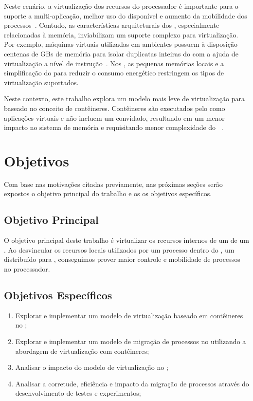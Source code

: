 Neste cenário, a virtualização dos recursos do processador é importante para o suporte a multi-aplicação, melhor uso do \hardware disponível e aumento da mobilidade dos processos~\cite{vanz2022virtualizaccao}. Contudo, as características arquiteturais dos \lws, especialmente relacionadas à memória, inviabilizam um suporte complexo para virtualização. Por exemplo, máquinas virtuais utilizadas em ambientes \cloud possuem à disposição centenas de GBs de memória para isolar duplicatas inteiras do \os com a ajuda de virtualização a nível de instrução~\cite{sharma2016containers}. Nos \lws, as pequenas memórias locais e a simplificação do \hardware para reduzir o consumo energético restringem os tipos de virtualização suportados.

Neste contexto, este trabalho explora um modelo mais leve de virtualização para \lws baseado no conceito de contêineres. Contêineres são executados pelo \os como aplicações virtuais e não incluem um \os convidado, resultando em um menor impacto no sistema de memória e requisitando menor complexidade do \hardware~\cite{thalheim2018cntr, sharma2016containers}.

\section{Objetivos}
\label{sec.goals}

Com base nas motivações citadas previamente, nas próximas seções serão expostos o objetivo principal do trabalho e os os objetivos específicos.

\subsection{Objetivo Principal}
\label{sec.goals.primary}

O objetivo principal deste trabalho é virtualizar os recursos internos de um \cluster de um \lw. Ao desvincular os recursos locais utilizados por um processo dentro do \nanvix, um \os distribuído para \lws, conseguimos prover maior controle e mobilidade de processos no processador.

\subsection{Objetivos Específicos}
\label{sec.goals.secondary}

\begin{enumerate}[label= (\roman*)]
    \item Explorar e implementar um modelo de virtualização baseado em contêineres no \nanvix;
    \item Explorar e implementar um modelo de migração de processos no \nanvix utilizando a abordagem de virtualização com contêineres;
    \item Analisar o impacto do modelo de virtualização no \nanvix;
    \item Analisar a corretude, eficiência e impacto da migração de processos  através do desenvolvimento de testes e experimentos;
\end{enumerate}

